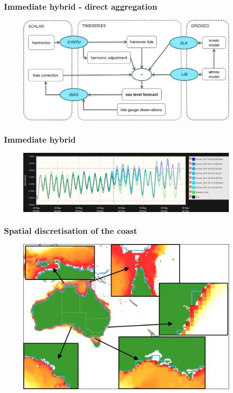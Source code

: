 \begin{frame}
\frametitle{Immediate hybrid - direct aggregation}
    \begin{figure}      
    \includegraphics[width=\textwidth]{figures/diagrams/aggSL_schematic_abstract.png}
    \end{figure}
\end{frame}
\begin{frame}
\frametitle{Immediate hybrid}
    \begin{figure}      
    \includegraphics[width=\textwidth]{figures/plots/forecast_eg.png}
    \end{figure}
\end{frame}
\begin{frame}
\frametitle{Spatial discretisation of the coast}
    \begin{figure}      
    \includegraphics[width=\textwidth]{figures/maps/omaps_masks.png}
    \end{figure}
\end{frame}
